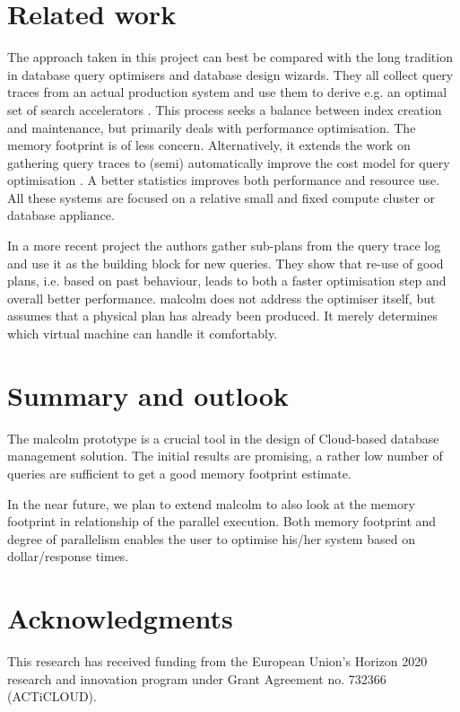 \documentclass[conference]{IEEEtran}
\def\Skip{\par\medskip\nobreak\noindent}
\begin{document}
\section{Related work}
The approach taken in this project can best be compared with the long tradition in database query optimisers and database design wizards.
They all collect query traces from an actual production system and use them to derive e.g. an optimal set of search accelerators \cite{DBLP:conf/vldb/ChaudhuriN07}.
This process seeks a balance between index creation and maintenance, but primarily deals with performance optimisation.
The memory footprint is of less concern.
Alternatively, it extends the work on gathering query traces to (semi) automatically improve the cost model for query optimisation \cite{DBLP:journals/ibmsj/MarklLR03}.
A better statistics improves both performance and resource use.
All these systems are focused on a relative small and fixed compute cluster or database  appliance.

In a more recent project \cite{DBLP:journals/pvldb/DingDWCN18} the authors gather sub-plans from the query trace log and use it as the building block for new queries.
They show that re-use of good plans, i.e. based on past behaviour, leads to both a faster optimisation step and overall better performance. {\sc malcolm} does not address the optimiser itself, but assumes that a physical plan has already been produced.
It merely determines which virtual machine can handle it comfortably.

\section{Summary and outlook\label{summary}} 
The {\sc malcolm} prototype is a crucial tool in the design of Cloud-based database management solution.
The initial results are promising, a rather low number of queries are sufficient to get a good memory footprint estimate.

In the near future, we plan to extend {\sc malcolm} to also look at the memory footprint in relationship of the parallel execution.
Both memory footprint and degree of parallelism enables the user to optimise his/her system based on dollar/response times.

\section*{Acknowledgments}
This research has received funding from the European Union’s Horizon 2020 research and innovation program under Grant Agreement no. 732366 (ACTiCLOUD).


\end{document}

